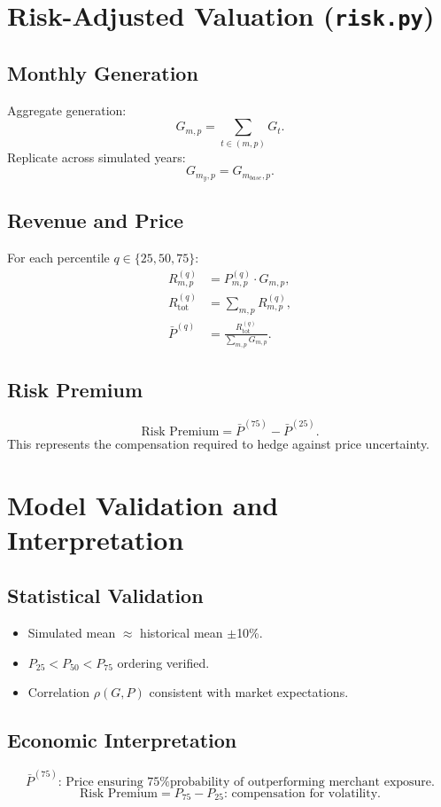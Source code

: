 \documentclass[12pt]{article}
\begin{document}
\section{Risk-Adjusted Valuation (\texttt{risk.py})}

\subsection{Monthly Generation}
Aggregate generation:
\[
G_{m,p} = \sum_{t \in (m,p)} G_t.
\]
Replicate across simulated years:
\[
G_{m_y,p} = G_{m_{base},p}.
\]

\subsection{Revenue and Price}
For each percentile \( q \in \{25,50,75\} \):
\begin{align*}
R_{m,p}^{(q)} &= P_{m,p}^{(q)} \cdot G_{m,p}, \\
R_{\text{tot}}^{(q)} &= \sum_{m,p} R_{m,p}^{(q)}, \\
\bar P^{(q)} &= \frac{R_{\text{tot}}^{(q)}}{\sum_{m,p} G_{m,p}}.
\end{align*}

\subsection{Risk Premium}
\[
\text{Risk Premium} = \bar P^{(75)} - \bar P^{(25)}.
\]
This represents the compensation required to hedge against price uncertainty.

\section{Model Validation and Interpretation}
\subsection{Statistical Validation}
\begin{itemize}
    \item Simulated mean $\approx$ historical mean $\pm$10\%.
    \item \( P_{25} < P_{50} < P_{75} \) ordering verified.
    \item Correlation \( \rho(G,P) \) consistent with market expectations.
\end{itemize}

\subsection{Economic Interpretation}
\[
\bar P^{(75)} \text{: Price ensuring 75\% probability of outperforming merchant exposure.}
\]
\[
\text{Risk Premium} = P_{75} - P_{25} \text{: compensation for volatility.}
\]
\end{document}
